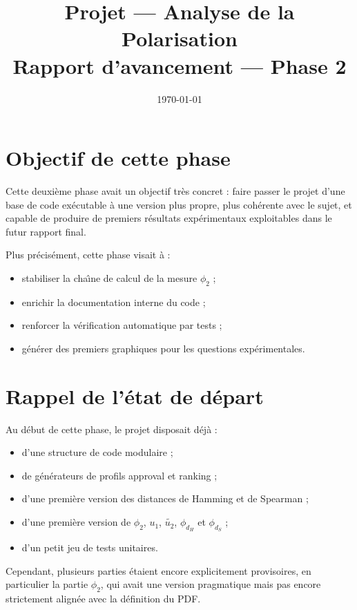 \documentclass[11pt,a4paper]{article}
\title{Projet --- Analyse de la Polarisation\\\large Rapport d'avancement --- Phase 2}
\author{}
\date{\today}
\begin{document}
\maketitle

\section{Objectif de cette phase}

Cette deuxi\`eme phase avait un objectif tr\`es concret : faire passer le projet d'une base de code ex\'ecutable \`a une version plus propre, plus coh\'erente avec le sujet, et capable de produire de premiers r\'esultats exp\'erimentaux exploitables dans le futur rapport final.

Plus pr\'ecis\'ement, cette phase visait \`a :
\begin{itemize}[leftmargin=*]
    \item stabiliser la cha\^\i ne de calcul de la mesure \(\phi_2\) ;
    \item enrichir la documentation interne du code ;
    \item renforcer la v\'erification automatique par tests ;
    \item g\'en\'erer des premiers graphiques pour les questions exp\'erimentales.
\end{itemize}

\section{Rappel de l'\'etat de d\'epart}

Au d\'ebut de cette phase, le projet disposait d\'ej\`a :
\begin{itemize}[leftmargin=*]
    \item d'une structure de code modulaire ;
    \item de g\'en\'erateurs de profils approval et ranking ;
    \item d'une premi\`ere version des distances de Hamming et de Spearman ;
    \item d'une premi\`ere version de \(\phi_2\), \(u_1\), \(\widetilde{u_2}\), \(\phi_{d_H}\) et \(\phi_{d_S}\) ;
    \item d'un petit jeu de tests unitaires.
\end{itemize}

Cependant, plusieurs parties \'etaient encore explicitement provisoires, en particulier la partie \(\phi_2\), qui avait une version pragmatique mais pas encore strictement align\'ee avec la d\'efinition du PDF.
\end{document}
